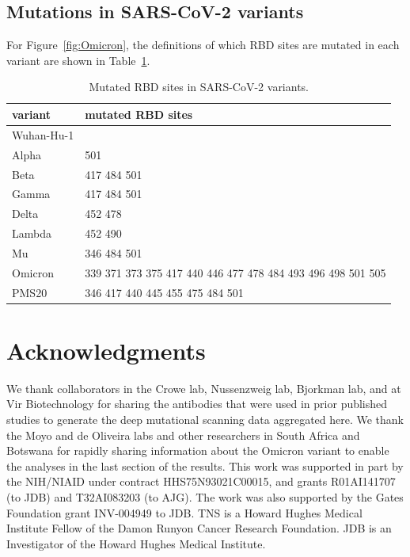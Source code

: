 \documentclass[9pt,twocolumn,twoside]{gsajnl_modified}
\begin{document}
{\subsection{Mutations in SARS-CoV-2 variants}
For Figure~\ref{fig:Omicron}, the definitions of which RBD sites are mutated in each variant are shown in Table~\ref{tab:variants}.
\begin{table}[h]
{\footnotesize
\begin{tabular}{ll}
\toprule
   variant &                                           mutated RBD sites \\
\midrule
Wuhan-Hu-1 &                                                             \\
     Alpha &                                                         501 \\
      Beta &                                                 417 484 501 \\
     Gamma &                                                 417 484 501 \\
     Delta &                                                     452 478 \\
    Lambda &                                                     452 490 \\
        Mu &                                                 346 484 501 \\
   Omicron & 339 371 373 375 417 440 446 477 478 484 493 496 498 501 505 \\
     PMS20 &                             346 417 440 445 455 475 484 501 \\
\bottomrule
\end{tabular}
}
\caption{Mutated RBD sites in SARS-CoV-2 variants.}
\label{tab:variants}
\end{table}

\section{Acknowledgments}
We thank collaborators in the Crowe lab, Nussenzweig lab, Bjorkman lab, and at Vir Biotechnology for sharing the antibodies that were used in prior published studies to generate the deep mutational scanning data aggregated here.
We thank the Moyo and de Oliveira labs and other researchers in South Africa and Botswana for rapidly sharing information about the Omicron variant to enable the analyses in the last section of the results.
This work was supported in part by the NIH/NIAID under contract HHS75N93021C00015, and grants R01AI141707 (to JDB) and T32AI083203 (to AJG).
The work was also supported by the Gates Foundation grant INV-004949 to JDB.
TNS is a Howard Hughes Medical Institute Fellow of the Damon Runyon Cancer Research Foundation.
JDB is an Investigator of the Howard Hughes Medical Institute.

}
\end{document}
